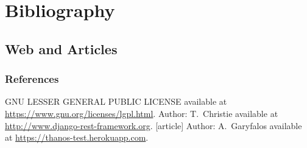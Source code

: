 \section{Bibliography}
\subsection*{Web and Articles}

\begin{frame}[allowframebreaks]
  \frametitle<presentation>{References}
     
  \begin{thebibliography}{10}
      GNU LESSER GENERAL PUBLIC LICENSE
      \newblock available at \url{https://www.gnu.org/licenses/lgpl.html}.
      Author: T.~Christie
      \newblock available at \url{http://www.django-rest-framework.org}.
    [article]
      Author: A.~Garyfalos
      \newblock available at \url{https://thanos-test.herokuapp.com}.
  \end{thebibliography}
\end{frame}
